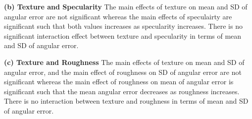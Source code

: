 \textbf{(b) Texture and Specularity} 
The main effects of texture on mean and SD of angular error are not significant whereas the main effects of speculairty are significant such that both values increases as specularity increases. There is no significant interaction effect between texture and specularity in terms of mean and SD of angular error.

\textbf{(c) Texture and Roughness} 
The main effects of texture on mean and SD of angular error, and the main effect of roughness on SD of angular error are not significant whereas the main effect of roughness on mean of angular error is significant such that the mean angular error decreases as roughness increases. There is no interaction between texture and roughness in terms of mean and SD of angular error.

